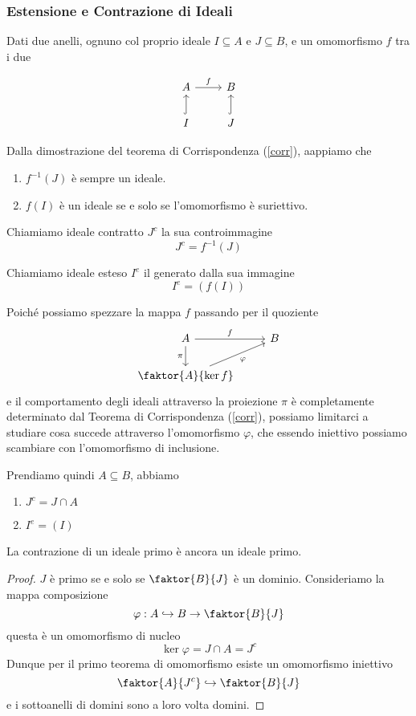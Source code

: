 \begin{multicols}{2}
\subsubsection{Estensione e Contrazione di Ideali} Dati due anelli, ognuno col proprio ideale $ I \subseteq A $ e $ J  \subseteq B $, e un omomorfismo $ f $ tra i due

\[ \begin{tikzcd}
A \arrow{r}{f}  & B \\
I \arrow[swap, hook]{u}{} & J \arrow[swap, hook]{u}{}
\end{tikzcd} \]

Dalla dimostrazione del teorema di Corrispondenza (\ref{corr}), aappiamo che 
\begin{enumerate}
	\item $ f^{-1}(J) $ è sempre un ideale.
	\item $ f(I) $ è un ideale se e solo se l'omomorfismo è suriettivo.
\end{enumerate}

\begin{definition}
	Chiamiamo ideale contratto $ J^c $ la sua controimmagine $$  J^c = f^{-1}(J)  $$
\end{definition}
\begin{definition}
	Chiamiamo ideale esteso $ I^e $ il generato dalla sua immagine
	\[I^e = \left(f(I)\right) \]
\end{definition}

Poiché possiamo spezzare la mappa $ f $ passando per il quoziente
\[ \begin{tikzcd}
A \arrow{r}{f} \arrow[swap]{d}{\pi} & B \\
\faktor{A}{\ker f} \arrow[swap]{ru}{\varphi}
\end{tikzcd} \]
e il comportamento degli ideali attraverso la proiezione $ \pi $ è completamente determinato dal Teorema di Corrispondenza (\ref{corr}), possiamo limitarci a studiare cosa succede attraverso l'omomorfismo $ \varphi $, che essendo iniettivo possiamo scambiare con l'omomorfismo di inclusione.

Prendiamo quindi $ A \subseteq B $, abbiamo
\begin{enumerate}
	\item $ J^c = J \cap A $
	\item $ I^e = (I) $
\end{enumerate}

\begin{theorem}
	La contrazione di un ideale primo è ancora un ideale primo.
\end{theorem}
\begin{proof}
	$ J $ è primo se e solo se $ \faktor{B}{J} $ è un dominio. Consideriamo la mappa composizione 
	\[ \varphi : A \hookrightarrow B \to \faktor{B}{J} \]
	questa è un omomorfismo di nucleo
	\[ \ker\varphi = J \cap A = J^c \]
	Dunque per il primo teorema di omomorfismo esiste un omomorfismo iniettivo
	\[ \faktor{A}{J^c} \hookrightarrow \faktor{B}{J} \]
	e i sottoanelli di domini sono a loro volta domini.
\end{proof}


\end{multicols}
